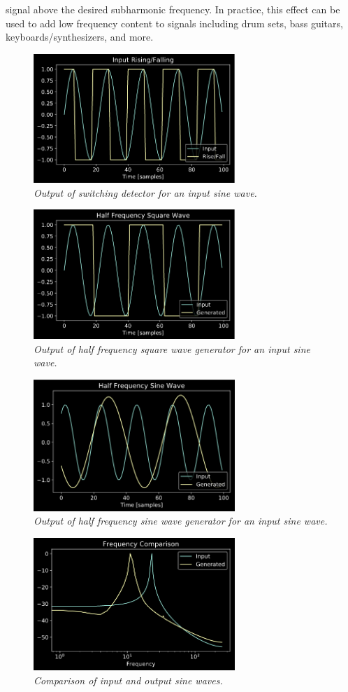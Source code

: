 \documentclass[twoside,a4paper]{article}
\begin{document}
signal above the desired subharmonic frequency. In practice,
this effect can be used to add low frequency content to signals
including drum sets, bass guitars, keyboards/synthesizers, and more.
%
\begin{figure}[h]
    \center
    \includegraphics[width=3in]{../Subharmonics/Pics/rise_fall.png}
    \caption{\label{square_full}{\it Output of switching detector for an input sine wave.}}
\end{figure}
%
\begin{figure}[h]
    \center
    \includegraphics[width=3in]{../Subharmonics/Pics/half_square.png}
    \caption{\label{square_half}{\it Output of half frequency square wave generator for an input sine wave.}}
\end{figure}
%
\begin{figure}[h]
    \center
    \includegraphics[width=3in]{../Subharmonics/Pics/half_sine.png}
    \caption{\label{sine_half}{\it Output of half frequency sine wave generator for an input sine wave.}}
\end{figure}
%
\begin{figure}[h]
    \center
    \includegraphics[width=3in]{../Subharmonics/Pics/freq_compare.png}
    \caption{\label{freq_compare}{\it Comparison of input and output sine waves.}}
\end{figure}
\end{document}
